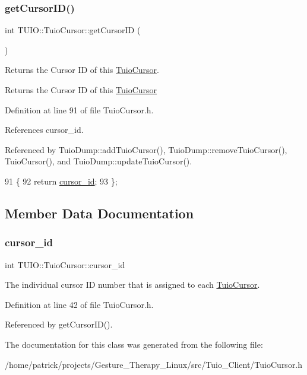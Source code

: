 \subsubsection{\texorpdfstring{get\+Cursor\+I\+D()}{getCursorID()}}
{\footnotesize\ttfamily int T\+U\+I\+O\+::\+Tuio\+Cursor\+::get\+Cursor\+ID (\begin{DoxyParamCaption}{ }\end{DoxyParamCaption})\hspace{0.3cm}{\ttfamily [inline]}}

Returns the Cursor ID of this \hyperlink{class_t_u_i_o_1_1_tuio_cursor}{Tuio\+Cursor}. \begin{DoxyReturn}{Returns}
the Cursor ID of this \hyperlink{class_t_u_i_o_1_1_tuio_cursor}{Tuio\+Cursor} 
\end{DoxyReturn}


Definition at line 91 of file Tuio\+Cursor.\+h.



References cursor\+\_\+id.



Referenced by Tuio\+Dump\+::add\+Tuio\+Cursor(), Tuio\+Dump\+::remove\+Tuio\+Cursor(), Tuio\+Cursor(), and Tuio\+Dump\+::update\+Tuio\+Cursor().


\begin{DoxyCode}
91                           \{
92             \textcolor{keywordflow}{return} \hyperlink{class_t_u_i_o_1_1_tuio_cursor_a6ce31b46c0bb528acc3be28e5dd1e278}{cursor\_id};
93         \};
\end{DoxyCode}


\subsection{Member Data Documentation}
\mbox{\label{class_t_u_i_o_1_1_tuio_cursor_a6ce31b46c0bb528acc3be28e5dd1e278}} 
\subsubsection{\texorpdfstring{cursor\+\_\+id}{cursor\_id}}
{\footnotesize\ttfamily int T\+U\+I\+O\+::\+Tuio\+Cursor\+::cursor\+\_\+id\hspace{0.3cm}{\ttfamily [protected]}}

The individual cursor ID number that is assigned to each \hyperlink{class_t_u_i_o_1_1_tuio_cursor}{Tuio\+Cursor}. 

Definition at line 42 of file Tuio\+Cursor.\+h.



Referenced by get\+Cursor\+I\+D().



The documentation for this class was generated from the following file\+:\begin{DoxyCompactItemize}
\item 
/home/patrick/projects/\+Gesture\+\_\+\+Therapy\+\_\+\+Linux/src/\+Tuio\+\_\+\+Client/Tuio\+Cursor.\+h\end{DoxyCompactItemize}
